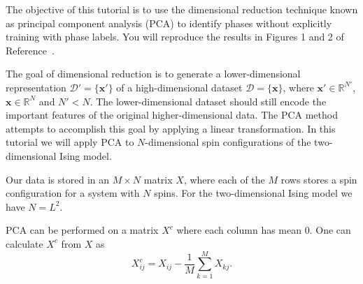 \documentclass[letterpaper]{scrartcl}
\begin{document}

\vspace{-3cm}


\date{May 29, 2019}

\maketitle

The objective of this tutorial is to use the dimensional reduction technique known as principal component analysis (PCA) to identify phases without explicitly training with phase labels.
You will reproduce the results in Figures 1 and 2 of Reference~\cite{wang}.

The goal of dimensional reduction is to generate a lower-dimensional representation $\mathcal{D}' = \{ \mathbf{x}' \}$ 
of a high-dimensional dataset $\mathcal{D} = \{ \mathbf{x} \}$, where $\mathbf{x}' \in \mathbb{R}^{N'}$, $\mathbf{x} \in \mathbb{R}^{N}$ and $N' < N$.
The lower-dimensional dataset should still encode the important features of the original higher-dimensional data.
The PCA method attempts to accomplish this goal by applying a linear transformation.
In this tutorial we will apply PCA to $N$-dimensional spin configurations of the two-dimensional Ising model.

Our data is stored in an $M \times N$ matrix $X$, where each of the $M$ rows stores a spin configuration for a system with $N$ spins.
For the two-dimensional Ising model we have $N=L^2$. %

PCA can be performed on a matrix $X^c$ where each column has mean 0.
One can calculate $X^{c}$ from $X$ as
\begin{equation}
X^c_{ij} = X_{ij} - \frac{1}{M} \sum_{k=1}^M X_{kj}.
\end{equation} 
\end{document}
